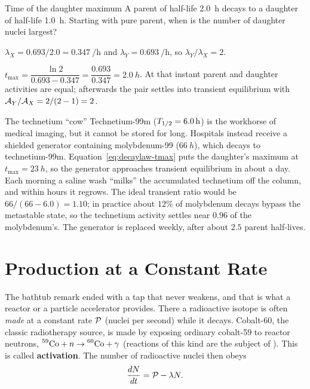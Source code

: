 \begin{exbox}{Time of the daughter maximum}
A parent of half-life \SI{2.0}{h} decays to a daughter of half-life \SI{1.0}{h}. Starting with pure
parent, when is the number of daughter nuclei largest?

 $\lambda_X=0.693/2.0=\SI{0.347}{\per\hour}$ and $\lambda_Y=\SI{0.693}{\per\hour}$, so
$\lambda_Y/\lambda_X=2$.

 $t_{\max}=\dfrac{\ln2}{0.693-0.347}=\dfrac{0.693}{0.347}=\SI{2.0}{h}$. At that instant
parent and daughter activities are equal; afterwards the pair settles into transient equilibrium with
$\mathcal{A}_Y/\mathcal{A}_X=2/(2-1)=2$.
\end{exbox}

\begin{remarkbox}{The technetium ``cow''}
Technetium-99m ($T_{1/2}=\SI{6.0}{h}$) is the workhorse of medical imaging, but it cannot be stored for
long. Hospitals instead receive a shielded generator containing molybdenum-99 ($\SI{66}{h}$), which
decays to technetium-99m. Equation~\eqref{eq:decaylaw-tmax} puts the daughter's maximum at
$t_{\max}=\SI{23}{h}$, so the generator approaches transient equilibrium in about a day. Each morning a
saline wash ``milks'' the accumulated technetium off the column, and within hours it regrows. The ideal
transient ratio would be $66/(66-6.0)=1.10$; in practice about $12\%$ of molybdenum decays bypass the
metastable state, so the technetium activity settles near $0.96$ of the molybdenum's. The generator is
replaced weekly, after about $2.5$ parent half-lives.
\end{remarkbox}

\section{Production at a Constant Rate}\label{sec:decaylaw-activation}

The bathtub remark ended with a tap that never weakens, and that is what a reactor or a particle
accelerator provides. There a radioactive isotope is often \emph{made} at a constant rate $\mathcal{P}$
(nuclei per second) while it decays. Cobalt-60, the classic radiotherapy source, is made by exposing
ordinary cobalt-59 to reactor neutrons, $\prescript{59}{}{\mathrm{Co}}+n\to\prescript{60}{}{\mathrm{Co}}+\gamma$ (reactions of this kind
are the subject of ). This is called \textbf{activation}. The number of radioactive
nuclei then obeys
\[
\frac{dN}{dt}=\mathcal{P}-\lambda N .
\]

